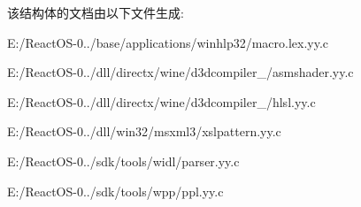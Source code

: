 该结构体的文档由以下文件生成\+:\begin{DoxyCompactItemize}
\item 
E\+:/\+React\+O\+S-\/0../base/applications/winhlp32/macro.\+lex.\+yy.\+c\item 
E\+:/\+React\+O\+S-\/0../dll/directx/wine/d3dcompiler\+\_/asmshader.\+yy.\+c\item 
E\+:/\+React\+O\+S-\/0../dll/directx/wine/d3dcompiler\+\_/hlsl.\+yy.\+c\item 
E\+:/\+React\+O\+S-\/0../dll/win32/msxml3/xslpattern.\+yy.\+c\item 
E\+:/\+React\+O\+S-\/0../sdk/tools/widl/parser.\+yy.\+c\item 
E\+:/\+React\+O\+S-\/0../sdk/tools/wpp/ppl.\+yy.\+c\end{DoxyCompactItemize}
